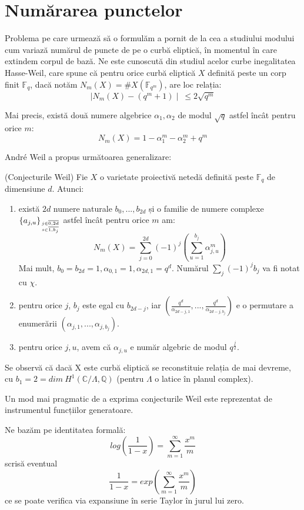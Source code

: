 \documentclass[13pt,openany]{book}
\begin{document}
\chapter{Numărarea punctelor}

Problema pe care urmează să o formulăm a pornit de la cea a studiului modului cum variază numărul de puncte de pe o curbă eliptică, în momentul în care extindem corpul de bază. Ne este cunoscută din studiul acelor curbe inegalitatea Hasse-Weil, care spune că pentru orice curbă eliptică $X$ definită peste un corp finit $\mathbb{F}_q$, dacă notăm $N_m(X)=\#X(\mathbb{F}_{q^m})$, are loc relația:
$$\mid N_m(X) - (q^m+1)\mid\  \leq 2\sqrt{q^m}$$

Mai precis, există două numere algebrice $\alpha_1,\alpha_2$ de modul $\sqrt{q}$ astfel încât pentru orice $m$:
$$N_m(X) = 1 - \alpha_1^m - \alpha_2^m + q^m$$

André Weil a propus următoarea generalizare:
\begin{teo}
(Conjecturile Weil) Fie $X$ o varietate proiectivă netedă definită peste $\mathbb{F}_q$ de dimensiune $d$. Atunci:
\begin{enumerate}
\item există $2d$ numere naturale $b_0,...,b_{2d}$ și o familie de numere complexe $\{a_{j,u}\}_{j\in\overline{0,2d}\atop s\in\overline{1,b_j}}$ astfel încât pentru orice $m$ am:
$$N_m(X)=\sum\limits_{j=0}^{2d} (-1)^j (\sum\limits_{u=1}^{b_j} \alpha_{j,u}^m)$$
Mai mult, $b_0=b_{2d}=1, \alpha_{0,1}=1, \alpha_{2d,1}=q^d$. Numărul $\sum\limits_j (-1)^j b_j$ va fi notat cu $\chi$.
\item pentru orice $j$, $b_j$ este egal cu $b_{2d-j}$, iar $(\frac{q^d}{\alpha_{2d-j,1}},...,\frac{q^d}{\alpha_{2d-j,b_j}})$ e o permutare a enumerării $(\alpha_{j,1},...,\alpha_{j,b_j})$.
\item pentru orice $j,u$, avem că $\alpha_{j,u}$ e număr algebric de modul $q^{\frac{j}{2}}$.
\end{enumerate}
\end{teo}

Se observă că dacă X este curbă eliptică se reconstituie relația de mai devreme, cu $b_1=2=dim\ H^1(\mathbb{C}/\Lambda, \mathbb{Q})$ (pentru $\Lambda$ o latice în planul complex).

Un mod mai pragmatic de a exprima conjecturile Weil este reprezentat de instrumentul funcțiilor generatoare.

Ne bazăm pe identitatea formală:
$$log(\frac{1}{1-x})=\sum\limits_{m=1}^{\infty} \frac{x^m}{m}$$
scrisă eventual
$$\frac{1}{1-x}=exp(\sum\limits_{m=1}^{\infty} \frac{x^m}{m})$$
ce se poate verifica via expansiune în serie Taylor în jurul lui zero.
\end{document}
